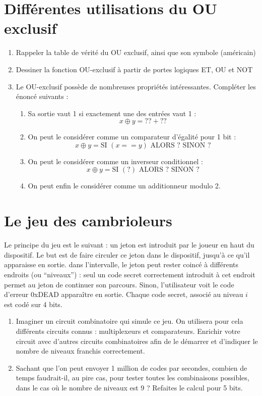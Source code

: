 \documentclass[a4paper,11pt]{article}
\begin{document}

\section{Différentes utilisations du OU exclusif}
\begin{enumerate}

\item Rappeler la table de vérité du OU exclusif, ainsi que son symbole (américain)
\item Dessiner la fonction OU-exclusif à partir de portes logiques ET, OU et NOT
\item Le OU-exclusif possède de nombreuses propriétés intéressantes. Compléter les énoncé suivants : 

\begin{enumerate}
\item Sa sortie vaut 1 si exactement une des entrées vaut 1 : $$x \oplus y  = ?? + ??$$
\item On peut le considérer comme un comparateur d'égalité pour 1 bit : $$x \oplus y = \textrm{SI } (x==y) \textrm{ ALORS ? SINON ?} $$
\item On peut le considérer comme un inverseur conditionnel : $$x \oplus y = \textrm{SI } (?) \textrm{ ALORS ? SINON ?}$$
\item On peut enfin le considérer comme un additionneur modulo 2.

\end{enumerate}

\end{enumerate}

\section{Le jeu des cambrioleurs}
Le principe du jeu est le suivant : un jeton est introduit par le joueur en haut du dispositif. Le but est de faire circuler ce jeton dans le dispositif, jusqu'à ce qu'il apparaisse en sortie. dans l'intervalle, le jeton peut rester coincé à différents endroits (ou ``niveaux'') : seul un code secret correctement introduit à cet endroit permet au jeton de continuer son parcours. Sinon, l'utilisateur voit le code d'erreur 0xDEAD apparaître en sortie. Chaque code secret, associé au niveau $i$ est codé sur 4 bits.

\begin{enumerate}
\item Imaginer un circuit combinatoire qui simule ce jeu.  On utilisera pour cela différents circuits connus : multiplexeurs et comparateurs. Enrichir votre circuit avec d'autres circuits combinatoires afin de le démarrer et d'indiquer le nombre de niveaux franchis correctement.
\item Sachant que l'on peut envoyer 1 million de codes par secondes, combien de temps faudrait-il, au pire cas, pour tester toutes les combinaisons possibles, dans le cas où le nombre de niveaux est 9 ? Refaites le calcul pour 5 bits.
\end{enumerate}
\end{document}

